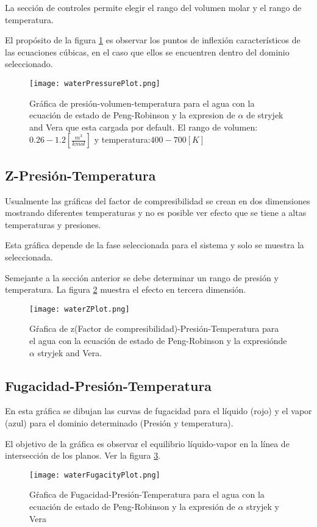 		La sección de controles permite elegir el rango del volumen molar y el rango de temperatura.
		
		El propósito de la figura \ref{fig:press} es observar los puntos de inflexión característicos de las ecuaciones cúbicas, en el caso que ellos se encuentren dentro del dominio seleccionado.

		\begin{figure}[!h]
			\texttt{[image: waterPressurePlot.png]}
			\caption{Gráfica de presión-volumen-temperatura para el agua con la ecuación de estado de Peng-Robinson y la expresion de $\alpha$ de stryjek and Vera que esta cargada por default. El rango de volumen: $0.26-1.2 [\frac{m^3}{kmol}]$ y temperatura:$400-700[K]$ }
			\label{fig:press}
		\end{figure}
	\subsection{Z-Presión-Temperatura}\label{subsec:zpt}
		Usualmente las gráficas del factor de compresibilidad se crean en dos dimensiones mostrando diferentes temperaturas y no es posible ver efecto que se tiene a altas temperaturas y presiones.

		Esta gráfica depende de la fase seleccionada para el sistema y solo se muestra la seleccionada.

		Semejante a la sección anterior se debe determinar un rango de presión y temperatura. La figura \ref{fig:zplot} muestra el efecto en tercera dimensión.
		\begin{figure}[!h]
			\texttt{[image: waterZPlot.png]}
			\caption{Gŕafica de z(Factor de compresibilidad)-Presión-Temperatura para el agua con la ecuación de estado de Peng-Robinson y la expresiónde $\alpha$ stryjek and Vera.}
			\label{fig:zplot}
		\end{figure}
	\subsection{Fugacidad-Presión-Temperatura}\label{subsec:fpt}

		En esta gráfica se dibujan las curvas de fugacidad para el líquido (rojo) y el vapor (azul) para el dominio determinado (Presión y temperatura).

		El objetivo de la gráfica es observar el equilibrio líquido-vapor en la línea de intersección de los planos. Ver la figura \ref{fig:fugplot}.

		\begin{figure}[!h]
			\texttt{[image: waterFugacityPlot.png]}
			\caption{Gŕafica de Fugacidad-Presión-Temperatura para el agua con la ecuación de estado de Peng-Robinson y la expresión de $\alpha$ stryjek y Vera}
			\label{fig:fugplot}
		\end{figure}
